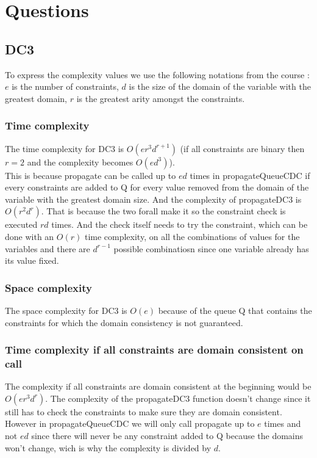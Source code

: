 \documentclass{eplDoc}
\begin{document}
\maketitle
\newpage

\section{Questions}
\subsection{DC3} %
To express the complexity values we use the following notations from the course : $e$ is the number of constraints, $d$ is the size of the domain of the variable with the greatest domain, $r$ is the greatest arity amongst the constraints.
\subsubsection{Time complexity}
The time complexity for DC3 is $O(er^3d^{r+1})$ (if all constraints are binary then $r=2$ and the complexity becomes $O(ed^3)$). \\ 
This is because propagate can be called up to $ed$ times in propagateQueueCDC if every constraints are added to Q for every value removed from the domain of the variable with the greatest domain size. And the complexity of propagateDC3 is $O(r^2d^r)$. That is because the two forall make it so the constraint check is executed $rd$ times. And the check itself needs to try the constraint, which can be done with an $O(r)$ time complexity, on all the combinations of values for the variables and there are $d^{r-1}$ possible combinatiosn since one variable already has its value fixed.


\subsubsection{Space complexity}
The space complexity for DC3 is $O(e)$ because of the queue Q that contains the constraints for which the domain consistency is not guaranteed.  

\subsubsection{Time complexity if all constraints are domain consistent on call}

The complexity if all constraints are domain consistent at the beginning would be $O(er^3d^r)$. The complexity of the propagateDC3 function doesn't change since it still has to check the constraints to make sure they are domain consistent. However in propagateQueueCDC we will only call propagate up to $e$ times and not $ed$ since there will never be any constraint added to Q because the domains won't change, wich is why the complexity is divided by $d$. 
\end{document}
